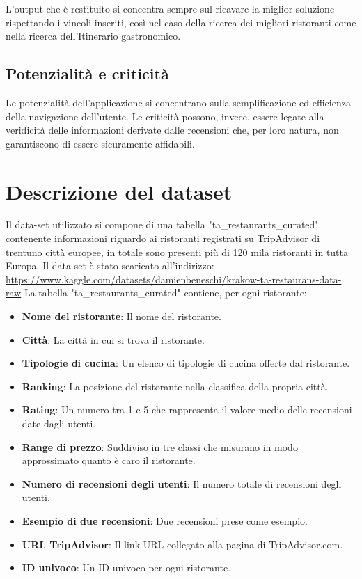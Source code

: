 \documentclass{report}
\begin{document}
L'output che è restituito si concentra sempre sul ricavare la miglior soluzione rispettando i vincoli inseriti, così nel caso della ricerca dei migliori ristoranti come nella ricerca dell'Itinerario gastronomico.

\section{Potenzialità e criticità}
Le potenzialità dell'applicazione si concentrano sulla semplificazione ed efficienza della navigazione dell'utente.
Le criticità possono, invece, essere legate alla veridicità delle informazioni derivate dalle recensioni che, per loro natura, non garantiscono di essere sicuramente affidabili.


\chapter{Descrizione del dataset}\label{cap_dataset}
Il data-set utilizzato si compone di una tabella "ta\_restaurants\_curated" contenente informazioni riguardo ai ristoranti registrati su TripAdvisor di trentuno città europee, in totale sono presenti più di 120 mila ristoranti in tutta Europa. Il data-set è stato scaricato all'indirizzo: \url{https://www.kaggle.com/datasets/damienbeneschi/krakow-ta-restaurans-data-raw}
La tabella "ta\_restaurants\_curated" contiene, per ogni ristorante:
\begin{itemize}
    \item \textbf{Nome del ristorante}: Il nome del ristorante.
    \item \textbf{Città}: La città in cui si trova il ristorante.
    \item \textbf{Tipologie di cucina}: Un elenco di tipologie di cucina offerte dal ristorante.
    \item \textbf{Ranking}: La posizione del ristorante nella classifica della propria città.
    \item \textbf{Rating}: Un numero tra 1 e 5 che rappresenta il valore medio delle recensioni date dagli utenti.
    \item \textbf{Range di prezzo}: Suddiviso in tre classi che misurano in modo approssimato quanto è caro il ristorante.
    \item \textbf{Numero di recensioni degli utenti}: Il numero totale di recensioni degli utenti.
    \item \textbf{Esempio di due recensioni}: Due recensioni prese come esempio.
    \item \textbf{URL TripAdvisor}: Il link URL collegato alla pagina di TripAdvisor.com.
    \item \textbf{ID univoco}: Un ID univoco per ogni ristorante.
\end{itemize}
\end{document}
